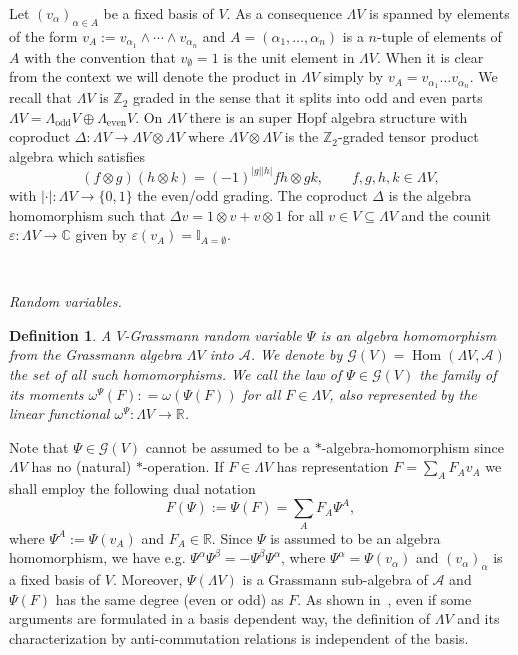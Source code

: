 \documentclass{article}
\newcommand{\assign}{:=}
\newcommand{\tmop}[1]{\ensuremath{\operatorname{#1}}}
\newcommand{\tmtextit}[1]{{\itshape{#1}}}
\newtheorem{definition}[theorem]{Definition}
\begin{document}
Let $(v_{\alpha})_{\alpha \in A}$ be a fixed basis of $V$. As a consequence
$\Lambda V$ is spanned by elements of the form $v_A \assign v_{\alpha_1}
\wedge \cdots \wedge v_{\alpha_n}$ and $A = (\alpha_1, \ldots, \alpha_n)$ is a
$n$-tuple of elements of $A$ with the convention that $v_{\emptyset} = 1$ is
the unit element in $\Lambda V$. When it is clear from the context we will
denote the product in $\Lambda V$ simply by $v_A = v_{\alpha_1} \ldots
v_{\alpha_n}$. We recall that $\Lambda V$ is $\mathbb{Z}_2$ graded in the
sense that it splits into odd and even parts $\Lambda V = \Lambda_{\tmop{odd}}
V \oplus \Lambda_{\tmop{even}} V$. On $\Lambda V$ there is an super Hopf
algebra structure with coproduct $\Delta : \Lambda V \rightarrow \Lambda V
\otimes \Lambda V$ where $\Lambda V \otimes \Lambda V$ is the
$\mathbb{Z}_2$-graded tensor product algebra which satisfies
\[ (f \otimes g) (h \otimes k) = (- 1)^{| g |  | h |} f h \otimes g k, \qquad
   f, g, h, k \in \Lambda V, \]
with $| \cdot | : \Lambda V \rightarrow \{ 0, 1 \}$ the even/odd grading. The
coproduct $\Delta$ is the algebra homomorphism such that $\Delta v = 1 \otimes
v + v \otimes 1$ for all $v \in V \subseteq \Lambda V$ and the counit
$\varepsilon : \Lambda V \rightarrow \mathbb{C}$ given by $\varepsilon (v_A)
=\mathbb{I}_{A = \emptyset}$.

\

\tmtextit{Random variables.}

\begin{definition}
  \label{def:Grassmann-rv}A $V$-Grassmann random variable $\Psi$ is an algebra
  homomorphism from the Grassmann algebra $\Lambda V$ into $\mathcal{A}$. We
  denote by $\mathcal{G} (V) = \tmop{Hom} (\Lambda V, \mathcal{A})$ the set of
  all such homomorphisms. We call the \tmtextit{law} of $\Psi \in \mathcal{G}
  (V)$ the family of its moments $\omega^{\Psi} (F) : = \omega (\Psi (F))$ for
  all $F \in \Lambda V$, also represented by the linear functional
  $\omega^{\Psi} : \Lambda V \rightarrow \mathbb{R}$.
\end{definition}

Note that $\Psi \in \mathcal{G} (V)$ cannot be assumed to be a
$\ast$-algebra-homomorphism since $\Lambda V$ has no (natural)
$\ast$-operation. If $F \in \Lambda V$ has representation $F = \sum_A F_A v_A$
we shall employ the following dual notation
\[ F (\Psi) \assign \Psi (F) = \sum_A F_A \Psi^A, \]
where $\Psi^A \assign \Psi (v_A)$ and $F_A \in \mathbb{R}$. Since $\Psi$ is
assumed to be an algebra homomorphism, we have e.g. $\Psi^{\alpha}
\Psi^{\beta} = - \Psi^{\beta} \Psi^{\alpha}$, where $\Psi^{\alpha} = \Psi
(v_{\alpha})$ and $(v_{\alpha})_{\alpha}$ is a fixed basis of $V$. Moreover,
$\Psi (\Lambda V)$ is a Grassmann sub-algebra of $\mathcal{A}$ and $\Psi (F)$
has the same degree (even or odd) as $F$. As shown
in~{\cite{van2003algebra1,van2003algebra2}}, even if some arguments are
formulated in a basis dependent way, the definition of $\Lambda V$ and its
characterization by anti-commutation relations is independent of the basis.
\end{document}
